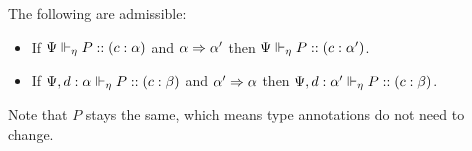 \begin{lemma}
  \label{algorithmic:delegation-sub}
  The following are admissible:
  \begin{itemize}
    \item If ${\Psi} \Vdash_{\eta} P :: (c : \alpha)$ and $\alpha \mathrel\Rightarrow \alpha'$ then ${\Psi} \Vdash_{\eta} P :: (c : \alpha')$.
    \item If ${\Psi, d : \alpha} \Vdash_{\eta} P :: (c : \beta)$ and $\alpha' \mathrel\Rightarrow \alpha$ then ${\Psi, d : \alpha'} \Vdash_{\eta} P :: (c : \beta)$.
  \end{itemize}
  Note that $P$ stays the same, which means type annotations do not need to change.
\end{lemma}

